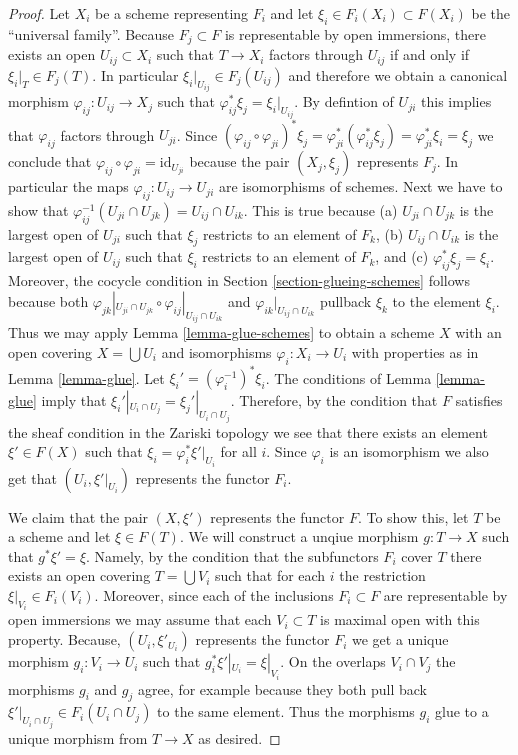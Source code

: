 \begin{proof}
Let $X_i$ be a scheme representing $F_i$ and let
$\xi_i \in F_i(X_i) \subset F(X_i)$ be the ``universal family''.
Because $F_j \subset F$ is representable by open immersions,
there exists an open $U_{ij} \subset X_i$ such that
$T \to X_i$ factors through $U_{ij}$ if and only if
$\xi_i|_T \in F_j(T)$. In particular
$\xi_i|_{U_{ij}} \in F_j(U_{ij})$ and therefore we obtain a
canonical morphism $\varphi_{ij} : U_{ij} \to X_j$ such that
$\varphi_{ij}^*\xi_j = \xi_i|_{U_{ij}}$. By defintion of $U_{ji}$
this implies that $\varphi_{ij}$ factors through $U_{ji}$.
Since $(\varphi_{ij} \circ \varphi_{ji})^*\xi_j
=\varphi_{ji}^*(\varphi_{ij}^*\xi_j) =
\varphi_{ji}^*\xi_i = \xi_j$ we conclude that
$\varphi_{ij} \circ \varphi_{ji} = \text{id}_{U_{ji}}$
because the pair $(X_j, \xi_j)$ represents $F_j$.
In particular the maps $\varphi_{ij} : U_{ij} \to U_{ji}$
are isomorphisms of schemes.
Next we have to show that
$\varphi_{ij}^{-1}(U_{ji} \cap U_{jk}) = U_{ij} \cap U_{ik}$.
This is true because (a) $U_{ji} \cap U_{jk}$ is the largest
open of $U_{ji}$ such that $\xi_j$ restricts to an element
of $F_k$, (b) $U_{ij} \cap U_{ik}$ is the largest
open of $U_{ij}$ such that $\xi_i$ restricts to an element
of $F_k$, and (c) $\varphi_{ij}^*\xi_j = \xi_i$. Moreover,
the cocycle condition in Section \ref{section-glueing-schemes}
follows because both
$\varphi_{jk}|_{U_{ji} \cap U_{jk}} \circ
\varphi_{ij}|_{U_{ij} \cap U_{ik}}$ and
$\varphi_{ik}|_{U_{ij} \cap U_{ik}}$ pullback $\xi_k$
to the element $\xi_i$.
Thus we may apply Lemma \ref{lemma-glue-schemes}
to obtain a scheme $X$ with an open
covering $X = \bigcup U_i$ and isomorphisms $\varphi_i : X_i \to U_i$
with properties as in Lemma \ref{lemma-glue}.
Let $\xi_i' = (\varphi_i^{-1})^* \xi_i$.
The conditions of Lemma \ref{lemma-glue} imply that
$\xi_i'|_{U_i \cap U_j} = \xi_j'|_{U_i \cap U_j}$.
Therefore, by the condition that $F$ satisfies the sheaf
condition in the Zariski topology we see that
there exists an element $\xi' \in F(X)$ such that
$\xi_i = \varphi_i^*\xi'|_{U_i}$ for all $i$.
Since $\varphi_i$ is an isomorphism we also get that
$(U_i, \xi'|_{U_i})$ represents the functor $F_i$.

\medskip\noindent
We claim that the pair $(X, \xi')$ represents the functor $F$.
To show this, let $T$ be a scheme and let $\xi \in F(T)$.
We will construct a unqiue morphism $g : T \to X$ such that
$g^*\xi' = \xi$. Namely, by the condition that the subfunctors
$F_i$ cover $T$ there exists an open covering $T = \bigcup V_i$
such that for each $i$ the restriction $\xi|_{V_i} \in F_i(V_i)$.
Moreover, since each of the inclusions $F_i \subset F$ are representable
by open immersions we may assume that each $V_i \subset T$ is maximal
open with this property.
Because, $(U_i, \xi'_{U_i})$ represents the functor $F_i$ we
get a unique morphism $g_i : V_i \to U_i$ such that
$g_i^*\xi'|_{U_i} = \xi|_{V_i}$. On the overlaps $V_i \cap V_j$
the morphisms $g_i$ and $g_j$ agree, for example because they both
pull back $\xi'|_{U_i \cap U_j} \in F_i(U_i \cap U_j)$
to the same element. Thus the morphisms $g_i$ glue to a unique morphism
from $T \to X$ as desired.
\end{proof}

